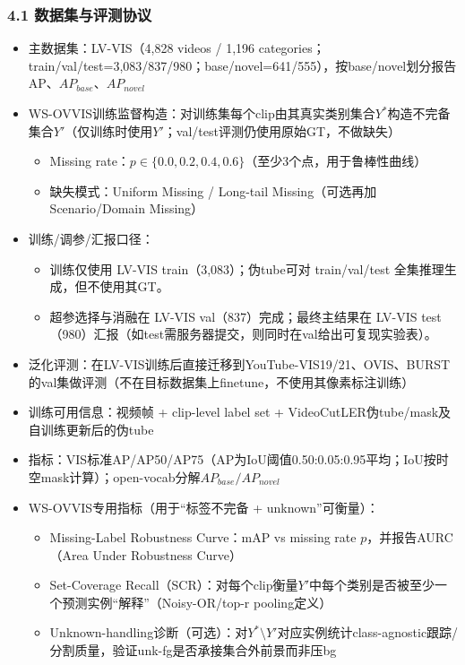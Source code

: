 \documentclass[UTF8]{ctexart}
\begin{document}
\subsubsection*{4.1 数据集与评测协议}
\begin{itemize}
\item 主数据集：LV-VIS（4,828 videos / 1,196 categories；train/val/test=3,083/837/980；base/novel=641/555），按base/novel划分报告AP、$AP_{base}$、$AP_{novel}$
\item WS-OVVIS训练监督构造：对训练集每个clip由其真实类别集合$Y^*$构造不完备集合$Y'$（仅训练时使用$Y'$；val/test评测仍使用原始GT，不做缺失）
\begin{itemize}
\item Missing rate：$p \in \{0.0, 0.2, 0.4, 0.6\}$（至少3个点，用于鲁棒性曲线）
\item 缺失模式：Uniform Missing / Long-tail Missing（可选再加Scenario/Domain Missing）
\end{itemize}
\item 训练/调参/汇报口径：
\begin{itemize}
\item 训练仅使用 LV-VIS train（3,083）；伪tube可对 train/val/test 全集推理生成，但不使用其GT。
\item 超参选择与消融在 LV-VIS val（837）完成；最终主结果在 LV-VIS test（980）汇报（如test需服务器提交，则同时在val给出可复现实验表）。
\end{itemize}
\item 泛化评测：在LV-VIS训练后直接迁移到YouTube-VIS19/21、OVIS、BURST的val集做评测（不在目标数据集上finetune，不使用其像素标注训练）
\item 训练可用信息：视频帧 + clip-level label set + VideoCutLER伪tube/mask及自训练更新后的伪tube
\item 指标：VIS标准AP/AP50/AP75（AP为IoU阈值0.50:0.05:0.95平均；IoU按时空mask计算）；open-vocab分解$AP_{base}/AP_{novel}$
\item WS-OVVIS专用指标（用于“标签不完备 + unknown”可衡量）：
\begin{itemize}
\item Missing-Label Robustness Curve：mAP vs missing rate $p$，并报告AURC（Area Under Robustness Curve）
\item Set-Coverage Recall（SCR）：对每个clip衡量$Y'$中每个类别是否被至少一个预测实例“解释”（Noisy-OR/top-r pooling定义）
\item Unknown-handling诊断（可选）：对$Y^*\setminus Y'$对应实例统计class-agnostic跟踪/分割质量，验证unk-fg是否承接集合外前景而非压bg
\end{itemize}
\end{itemize}
\end{document}
